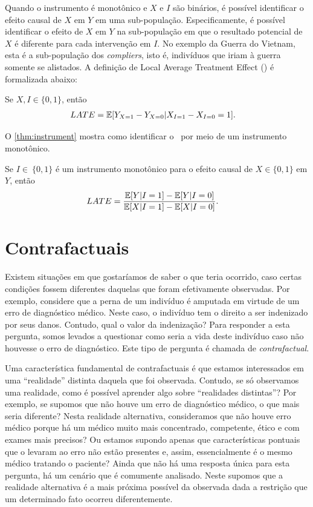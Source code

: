 Quando o instrumento é monotônico e
$X$ e $I$ são binários, é
possível identificar o efeito causal de
$X$ em $Y$ em uma sub-população.
Especificamente, é possível identificar
o efeito de $X$ em $Y$ na sub-população em que
o resultado potencial de $X$ é
diferente para cada intervenção em $I$.
No exemplo da Guerra do Vietnam,
esta é a sub-população dos \textit{compliers}, isto é,
indivíduos que iriam à guerra somente se alistados.
A definição de Local Average Treatment Effect (\LACE)
é formalizada abaixo:

\begin{definition}
 \label{def:lace}
 Se $X, I \in \{0,1\}$, então
 \begin{align*}
  {LATE} &= {\mathbb E}[Y_{X=1}-Y_{X=0}|X_{I=1}-X_{I=0} = 1].
 \end{align*}
\end{definition}

O \cref{thm:instrument} mostra como
identificar o \LACE \ por meio de um instrumento monotônico.

\begin{theorem}
 \label{thm:instrument}
 Se $I \in\ \{0,1\}$ é um instrumento monotônico para
 o efeito causal de $X \in \{0,1\}$ em $Y$, então
 \begin{align*}
  {LATE} &= \frac{{\mathbb E}[Y|I=1]-{\mathbb E}[Y|I=0]}{{\mathbb E}[X|I=1]-{\mathbb E}[X|I=0]}.
 \end{align*}
\end{theorem}

\section{Contrafactuais}
\label{sec:contrafactuais}

Existem situações em que gostaríamos de saber
o que teria ocorrido, caso certas condições fossem diferentes
daquelas que foram efetivamente observadas.
Por exemplo, considere que a perna de um indivíduo é amputada
em virtude de um erro de diagnóstico médico.
Neste caso, o indivíduo tem o direito 
a ser indenizado por seus danos.
Contudo, qual o valor da indenização?
Para responder a esta pergunta,
somos levados a questionar 
como seria a vida deste indivíduo 
caso não houvesse o erro de diagnóstico.
Este tipo de pergunta é chamada de \textit{contrafactual}.

Uma característica fundamental de contrafactuais é que
estamos interessados em uma ``realidade'' distinta
daquela que foi observada.
Contudo, se só observamos uma realidade,
como é possível aprender algo sobre ``realidades distintas''?
Por exemplo, se supomos que 
não houve um erro de diagnóstico médico,
o que mais seria diferente?
Nesta realidade alternativa, consideramos que
não houve erro médico porque
há um médico muito mais concentrado, competente, 
ético e com exames mais precisos?
Ou estamos supondo apenas que
características pontuais que o levaram ao erro não estão presentes e,
assim, essencialmente é o mesmo médico tratando o paciente?
Ainda que não há uma resposta única para esta pergunta,
há um cenário que é comumente analisado.
Neste supomos que a realidade alternativa é 
a mais próxima possível da observada dada
a restrição que um determinado fato ocorreu diferentemente.

